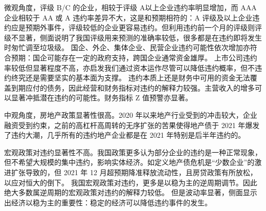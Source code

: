 \begin{table}
\begin{longtable}{p{0.18\linewidth}p{0.1\linewidth}p{0.1\linewidth}p{0.1\linewidth}p{0.1\linewidth}p{0.12\linewidth}p{0.1\linewidth}}
		\label{tab:Logitresult}
	\end{longtable}
\end{table}

微观角度，评级 B/C 的企业，相较于评级 A以上企业违约率明显增加，而 AAA 企业相较于 AA 或 A 违约率差异不大，这是和预期相符的：A 评级及以上企业违约应是预期外事件，评级较低的企业更容易违约。但利用违约前一个月的评级则评级不显著，侧面说明了我国评级用来预测的准确率较低，很多都是在违约即将发生时匆忙调至垃圾级。
国企、外企、集体企业、民营企业违约可能性依次增加亦符合预期：国企可能存在一定的政府支持\autocite{mo2021china}，跨国企业通常资金雄厚。
上市公司违约率较低但显著程度不高，亦启发我们通过资本运作尽管可以降低违约概率，但不违约终究还是需要坚实的基本面为支撑。
违约本质上还是财务中可用的资金无法覆盖到期应付的债务，因此经营和财务指标对违约的解释力较强。主营收入的增多可以显著冲抵潜在违约的可能性。财务指标 Z 值预警亦显著。

中观角度，房地产政策显著性很高。2020 年以来地产行业受到的冲击较大，企业融资受到约束，之前的高杠杆高周转的无序扩张的苦果使得地产债于 2021 年爆发了违约大潮，几乎所有的违约地产企业都是在 2021 年特别是后半年违约的。

宏观政策对违约显著性不高。我国政策更多认为部分企业的违约是一种正常现象，但不希望大规模的集中违约，影响实体经济。如定义地产债危机是“少数企业”的激进扩张导致的，但 2021 年 12 月超预期降准释放流动性，且房贷政策有所放松，以应对恒大的倒下。
我国宏观政策对违约，更多是以稳为主的逆周期调节。因此绝大多数属逆周期的宏观政策对违约的解释力较低。
但是波动率显著，侧面显示出经济以稳为主的重要性：稳定的经济可以降低违约事件的发生。


